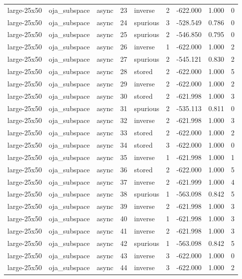 \begin{tabular}{lllrlrrrr}
large-25x50 & oja\_subspace & async & 23 & inverse & 2 & -622.000 & 1.000 & 0 \\
large-25x50 & oja\_subspace & async & 24 & spurious & 3 & -528.549 & 0.786 & 0 \\
large-25x50 & oja\_subspace & async & 25 & spurious & 2 & -546.850 & 0.795 & 0 \\
large-25x50 & oja\_subspace & async & 26 & inverse & 1 & -622.000 & 1.000 & 2 \\
large-25x50 & oja\_subspace & async & 27 & spurious & 2 & -545.121 & 0.830 & 2 \\
large-25x50 & oja\_subspace & async & 28 & stored & 2 & -622.000 & 1.000 & 5 \\
large-25x50 & oja\_subspace & async & 29 & inverse & 2 & -622.000 & 1.000 & 2 \\
large-25x50 & oja\_subspace & async & 30 & stored & 2 & -621.998 & 1.000 & 3 \\
large-25x50 & oja\_subspace & async & 31 & spurious & 2 & -535.113 & 0.811 & 0 \\
large-25x50 & oja\_subspace & async & 32 & inverse & 2 & -621.998 & 1.000 & 3 \\
large-25x50 & oja\_subspace & async & 33 & stored & 2 & -622.000 & 1.000 & 2 \\
large-25x50 & oja\_subspace & async & 34 & stored & 3 & -622.000 & 1.000 & 0 \\
large-25x50 & oja\_subspace & async & 35 & inverse & 1 & -621.998 & 1.000 & 1 \\
large-25x50 & oja\_subspace & async & 36 & stored & 2 & -622.000 & 1.000 & 5 \\
large-25x50 & oja\_subspace & async & 37 & inverse & 2 & -621.999 & 1.000 & 4 \\
large-25x50 & oja\_subspace & async & 38 & spurious & 1 & -563.098 & 0.842 & 5 \\
large-25x50 & oja\_subspace & async & 39 & inverse & 2 & -621.998 & 1.000 & 3 \\
large-25x50 & oja\_subspace & async & 40 & inverse & 1 & -621.998 & 1.000 & 3 \\
large-25x50 & oja\_subspace & async & 41 & inverse & 2 & -621.998 & 1.000 & 3 \\
large-25x50 & oja\_subspace & async & 42 & spurious & 1 & -563.098 & 0.842 & 5 \\
large-25x50 & oja\_subspace & async & 43 & inverse & 3 & -622.000 & 1.000 & 0 \\
large-25x50 & oja\_subspace & async & 44 & inverse & 3 & -622.000 & 1.000 & 2 \\

\end{tabular}

